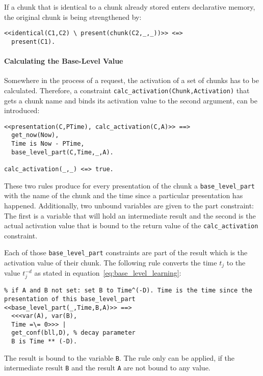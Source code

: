 If a chunk that is identical to a chunk already stored enters declarative memory, the original chunk is being strengthened by:

\begin{lstlisting}
<<identical(C1,C2) \ present(chunk(C2,_,_))>> <=> 
  present(C1).
\end{lstlisting}

\paragraph{Calculating the Base-Level Value}

Somewhere in the process of a request, the activation of a set of chunks has to be calculated. Therefore, a constraint \verb|calc_activation(Chunk,Activation)|  that gets a chunk name and binds its activation value to the second argument, can be introduced:

\begin{lstlisting}
<<presentation(C,PTime), calc_activation(C,A)>> ==> 
  get_now(Now), 
  Time is Now - PTime, 
  base_level_part(C,Time,_,A).
  
calc_activation(_,_) <=> true.
\end{lstlisting}

These two rules produce for every presentation of the chunk a \verb|base_level_part| with the name of the chunk and the time since a particular presentation has happened. Additionally, two unbound variables are given to the part constraint: The first is a variable that will hold an intermediate result and the second is the actual activation value that is bound to the return value of the \verb|calc_activation| constraint.

Each of those \verb|base_level_part| constraints are part of the result which is the activation value of their chunk. The following rule converts the time $t_j$ to the value $t_j^{-d}$ as stated in equation~\eqref{eq:base_level_learning}:

\begin{lstlisting}
% if A and B not set: set B to Time^(-D). Time is the time since the presentation of this base_level_part
<<base_level_part(_,Time,B,A)>> ==>
  <<<var(A), var(B), 
  Time =\= 0>>> |
  get_conf(bll,D), % decay parameter
  B is Time ** (-D).
\end{lstlisting}

The result is bound to the variable \verb|B|. The rule only can be applied, if the intermediate result \verb|B| and the result \verb|A| are not bound to any value.

